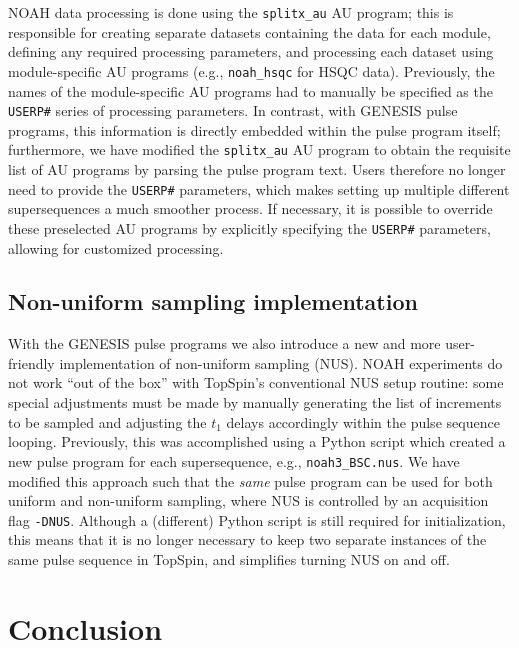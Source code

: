 \documentclass[a4paper,11pt]{article}
\newcommand{\carbon}{\ch{^{13}C}}
\begin{document}
\begin{refsection}
NOAH data processing is done using the \texttt{splitx\_au} AU program; this is responsible for creating separate datasets containing the data for each module, defining any required processing parameters, and processing each dataset using module-specific AU programs (e.g., \texttt{noah\_hsqc} for \carbon{} HSQC data).
Previously, the names of the module-specific AU programs had to manually be specified as the \texttt{USERP\#} series of processing parameters.
In contrast, with GENESIS pulse programs, this information is directly embedded within the pulse program itself; furthermore, we have modified the \texttt{splitx\_au} AU program to obtain the requisite list of AU programs by parsing the pulse program text.
Users therefore no longer need to provide the \texttt{USERP\#} parameters, which makes setting up multiple different supersequences a much smoother process.
If necessary, it is possible to override these preselected AU programs by explicitly specifying the \texttt{USERP\#} parameters, allowing for customized processing.

\subsection{Non-uniform sampling implementation}
\label{subsec:nus}

With the GENESIS pulse programs we also introduce a new and more user-friendly implementation of non-uniform sampling (NUS).
NOAH experiments do not work ``out of the box'' with TopSpin's conventional NUS setup routine: some special adjustments must be made by manually generating the list of increments to be sampled and adjusting the \(t_1\) delays accordingly within the pulse sequence looping.
Previously, this was accomplished using a Python script which created a new pulse program for each supersequence, e.g., \texttt{noah3\_BSC.nus}.\autocite{Claridge2019MRC}
We have modified this approach such that the \textit{same} pulse program can be used for both uniform and non-uniform sampling, where NUS is controlled by an acquisition flag \texttt{-DNUS}.
Although a (different) Python script is still required for initialization, this means that it is no longer necessary to keep two separate instances of the same pulse sequence in TopSpin, and simplifies turning NUS on and off.


\section{Conclusion}


\end{refsection}
\end{document}

